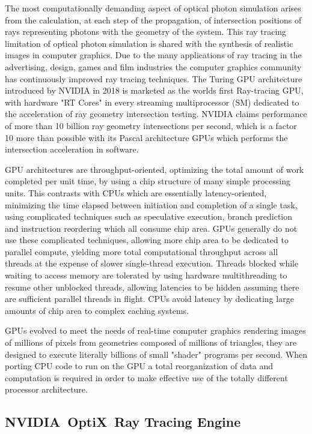 \documentclass{webofc}
\begin{document}
The most computationally demanding aspect of optical photon simulation 
arises from the calculation, at each step of the propagation, 
of intersection positions of rays representing photons with the geometry of the system.
This ray tracing limitation of optical photon simulation is shared 
with the synthesis of realistic images in computer graphics. Due to the many applications
of ray tracing in the advertising, design, games and film industries the computer graphics
community has continuously improved ray tracing techniques. The Turing GPU architecture 
introduced by NVIDIA in 2018 is marketed as the worlds first Ray-tracing GPU, with   
hardware "RT Cores" in every streaming multiprocessor (SM) dedicated to the 
acceleration of ray geometry intersection testing.
NVIDIA claims performance of more than 10 billion ray geometry intersections 
per second, which is a factor 10 more than possible with its Pascal architecture GPUs
which performs the intersection acceleration in software. 

GPU architectures are throughput-oriented\cite{throughput}, optimizing the total amount of work completed per unit time,
by using a chip structure of many simple processing units. This contrasts with CPUs which are essentially latency-oriented, 
minimizing the time elapsed between initiation and completion of a single task, using complicated techniques 
such as speculative execution, branch prediction and instruction reordering which all consume chip area.
GPUs generally do not use these complicated techniques, allowing more chip area to be dedicated to parallel compute, 
yielding more total computational throughput across all threads at the expense of slower single-thread execution.
Threads blocked while waiting to access memory are tolerated by using 
hardware multithreading to resume other unblocked threads, allowing latencies to be hidden assuming 
there are sufficient parallel threads in flight. CPUs avoid latency by dedicating large amounts 
of chip area to complex caching systems. 

GPUs evolved to meet the needs of real-time computer graphics rendering images of millions of pixels from geometries
composed of millions of triangles, they are designed to execute literally billions of small "shader" 
programs per second. When porting CPU code to run on the GPU a total reorganization of 
data and computation is required in order to make effective use of the totally different processor 
architecture.

\subsection{NVIDIA\textregistered\ OptiX\texttrademark\ Ray Tracing Engine}
\end{document}
